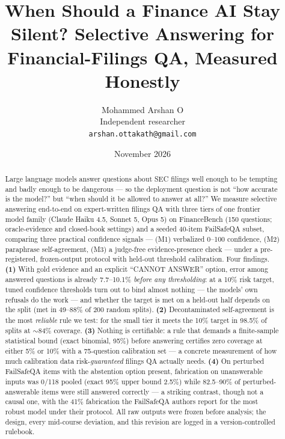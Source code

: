 \documentclass[11pt]{article}
\title{When Should a Finance AI Stay Silent? Selective Answering for Financial-Filings QA, Measured Honestly}
\author{Mohammed Arshan O \\ Independent researcher \\ \texttt{arshan.ottakath@gmail.com}}
\date{November 2026}
\begin{document}
\maketitle



\begin{abstract}

Large language models answer questions about SEC filings well enough to be tempting and badly enough to be dangerous --- so the deployment question is not ``how accurate is the model?'' but ``when should it be allowed to answer at all?'' We measure selective answering end-to-end on expert-written filings QA with three tiers of one frontier model family (Claude Haiku 4.5, Sonnet 5, Opus 5) on FinanceBench (150 questions; oracle-evidence and closed-book settings) and a seeded 40-item FailSafeQA subset, comparing three practical confidence signals --- (M1) verbalized 0--100 confidence, (M2) paraphrase self-agreement, (M3) a judge-free evidence-presence check --- under a pre-registered, frozen-output protocol with held-out threshold calibration. Four findings. \textbf{(1)} With gold evidence and an explicit ``CANNOT ANSWER'' option, error among answered questions is already 7.7--10.1\% \emph{before any thresholding}: at a 10\% risk target, tuned confidence thresholds turn out to bind almost nothing --- the models' own refusals do the work --- and whether the target is met on a held-out half depends on the split (met in 49--88\% of 200 random splits). \textbf{(2)} Decontaminated self-agreement is the most \emph{reliable} rule we test: for the small tier it meets the 10\% target in 98.5\% of splits at $\sim$84\% coverage. \textbf{(3)} Nothing is certifiable: a rule that demands a finite-sample statistical bound (exact binomial, 95\%) before answering certifies zero coverage at either 5\% or 10\% with a 75-question calibration set --- a concrete measurement of how much calibration data risk-\emph{guaranteed} filings QA actually needs. \textbf{(4)} On perturbed FailSafeQA items with the abstention option present, fabrication on unanswerable inputs was 0/118 pooled (exact 95\% upper bound 2.5\%) while 82.5--90\% of perturbed-answerable items were still answered correctly --- a striking contrast, though not a causal one, with the 41\% fabrication the FailSafeQA authors report for the most robust model under their protocol. All raw outputs were frozen before analysis; the design, every mid-course deviation, and this revision are logged in a version-controlled rulebook.

\end{abstract}
\end{document}
